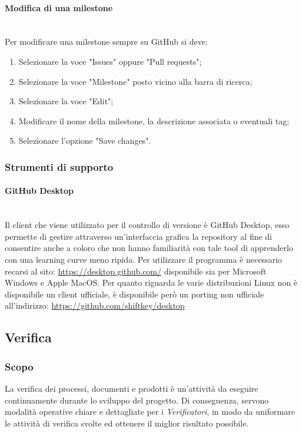 {\paragraph{Modifica di una milestone}\mbox{}\\
Per modificare una milestone sempre su GitHub si deve:
\begin{enumerate}
\item Selezionare la voce "Issues" oppure "Pull requests";
\item Selezionare la voce "Milestone" posto vicino alla barra di ricerca;
\item Selezionare la voce "Edit";
\item Modificare il nome della milestone, la descrizione associata o eventuali tag;
\item Selezionare l'opzione "Save changes".
\end{enumerate}

\subsubsection{Strumenti di supporto}
\paragraph{GitHub Desktop}\mbox{}\\
Il {client} che viene utilizzato per il controllo di versione è GitHub Desktop, esso permette di gestire attraverso un'interfaccia grafica la {repository} al fine di consentire anche a coloro che non hanno familiarità con tale tool di apprenderlo con una {learning curve} meno ripida. Per utilizzare il programma è necessario recarsi al sito: \url{https://desktop.github.com/} disponibile sia per {Microsoft Windows} e {Apple MacOS}. Per quanto riguarda le varie {distribuzioni Linux} non è disponibile un client ufficiale, è disponibile però un {porting} non ufficiale all'indirizzo: \url{https://github.com/shiftkey/desktop}

\subsection{Verifica}

\subsubsection{Scopo}

La verifica dei processi, documenti e prodotti è un'attività da eseguire continuamente durante lo sviluppo del progetto. Di conseguenza, servono modalità operative chiare e dettagliate per i \textit{Verificatori}, in modo da uniformare le attività di verifica svolte ed ottenere il miglior risultato possibile. 

}
